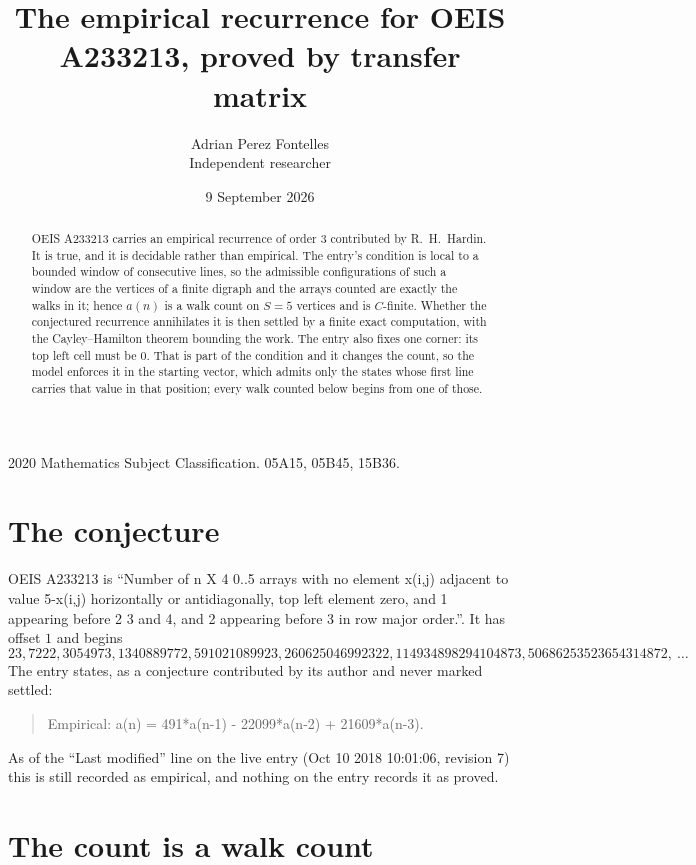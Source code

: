 \documentclass[11pt,a4paper]{article}
\title{The empirical recurrence for OEIS A233213, proved by transfer matrix}
\author{Adrian Perez Fontelles\\ \small Independent researcher}
\date{9 September 2026}
\theoremstyle{plain}
\theoremstyle{definition}
\begin{document}
\maketitle

\begin{abstract}
OEIS A233213 carries an empirical recurrence of order $3$ contributed by R.~H.~Hardin. It is
true, and it is decidable rather than empirical. The entry's condition is local to a bounded window of consecutive lines, so
the admissible configurations of such a window are the vertices of a finite digraph and the
arrays counted are exactly the walks in it; hence $a(n)$ is a walk count on $S=5$ vertices
and is $C$-finite. Whether the conjectured recurrence annihilates it is then settled by a
finite exact computation, with the Cayley--Hamilton theorem bounding the work.
 The entry also fixes one corner: its top left cell must be $0$. That is part of the condition and it changes the count, so the model enforces it in the starting vector, which admits only the states whose first line carries that value in that position; every walk counted below begins from one of those.\end{abstract}

\noindent\small 2020 Mathematics Subject Classification. 05A15, 05B45, 15B36.\normalsize

\section{The conjecture}

OEIS A233213 is ``Number of n X 4 0..5 arrays with no element x(i,j) adjacent to value 5-x(i,j) horizontally or antidiagonally, top left element zero, and 1 appearing before 2 3 and 4, and 2 appearing before 3 in row major order.''. It has offset $1$ and begins
\[
23, 7222, 3054973, 1340889772, 591021089923, 260625046992322, 114934898294104873, 50686253523654314872,\ \dots
\]
The entry states, as a conjecture contributed by its author and never marked settled:
\begin{quote}
Empirical: a(n) = 491*a(n-1) - 22099*a(n-2) + 21609*a(n-3).
\end{quote}
As of the ``Last modified'' line on the live entry (Oct 10 2018 10:01:06, revision 7) this is still
recorded as empirical, and nothing on the entry records it as proved.

\section{The count is a walk count}
\end{document}
